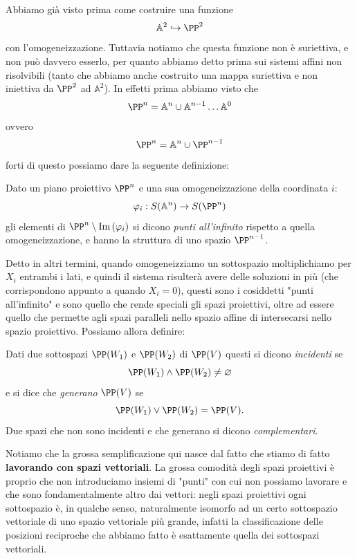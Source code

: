 \documentclass[11pt]{scrartcl}
\newcommand{\eset}{\varnothing}
\newcommand{\Immagine}[1]{\text{Im}\left(#1\right)}
\renewcommand{\AA}{\mathbb{A}}
\begin{document}
   	 Abbiamo già visto prima come costruire una funzione 
   	 $$\AA^2\hookrightarrow \PP^2$$
   	 con l'omogeneizzazione. Tuttavia notiamo che questa funzione non è suriettiva, e non può davvero esserlo, per quanto abbiamo detto prima sui sistemi affini non risolvibili (tanto che abbiamo anche costruito una mappa suriettiva e non iniettiva da $\PP^2$ ad $\AA^2$). In effetti prima abbiamo visto che
   	 $$\PP^n=\AA^n\cup \AA^{n-1}\dots \AA^{0}$$
   	 ovvero
   	 $$\PP^n=\AA^n\cup \PP^{n-1}$$
   	 forti di questo possiamo dare la seguente definizione:
   	 \begin{definition}
   	 	Dato un piano proiettivo $\PP^n$ e una sua omogeneizzazione della coordinata $i$:
   	 	$$\varphi_i:S(\AA^n) \to S(\PP^n)$$
   	 	gli elementi di $\PP^n\setminus\Immagine{\varphi_i}$ si dicono \textit{punti all'infinito} rispetto a quella omogeneizzazione, e hanno la struttura di uno spazio $\PP^{n-1}$. 
   	 \end{definition}
   	 Detto in altri termini, quando omogeneizziamo un sottospazio moltiplichiamo per $X_i$ entrambi i lati, e quindi il sistema risulterà avere delle soluzioni in più (che corrispondono appunto a quando $X_i=0$), questi sono i cosiddetti "punti all'infinito" e sono quello che rende speciali gli spazi proiettivi, oltre ad essere quello che permette agli spazi paralleli nello spazio affine di intersecarsi nello spazio proiettivo. Possiamo allora definire:
   	 \begin{definition}
   	 	Dati due sottospazi $\PP(W_1)$ e $\PP(W_2)$ di $\PP(V)$ questi si dicono \textit{incidenti} se 
   	 	$$\PP(W_1)\land\PP(W_2)\ne \eset$$
   	 	e si dice che \textit{generano} $\PP(V)$ se 
   	 	$$\PP(W_1)\lor \PP(W_2)=\PP(V).$$
   	 	Due spazi che non sono incidenti e che generano si dicono \textit{complementari}.
   	 \end{definition}
   	 Notiamo che la grossa semplificazione qui nasce dal fatto che stiamo di fatto \textbf{lavorando con spazi vettoriali}. La grossa comodità degli spazi proiettivi è proprio che non introduciamo insiemi di "punti" con cui non possiamo lavorare e che sono fondamentalmente altro dai vettori: negli spazi proiettivi ogni sottospazio è, in qualche senso, naturalmente isomorfo ad un certo sottospazio vettoriale di uno spazio vettoriale più grande, infatti la classificazione delle posizioni reciproche che abbiamo fatto è esattamente quella dei sottospazi vettoriali.
\end{document}
